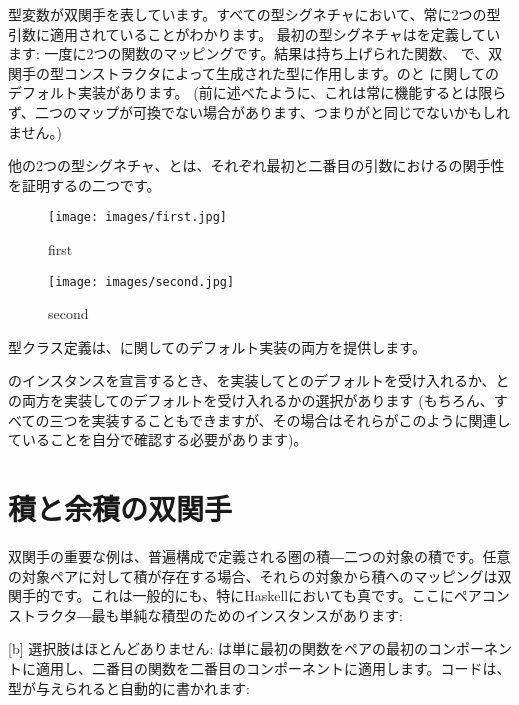 型変数が双関手を表しています。すべての型シグネチャにおいて、常に2つの型引数に適用されていることがわかります。
最初の型シグネチャはを定義しています: 一度に2つの関数のマッピングです。結果は持ち上げられた関数、
で、双関手の型コンストラクタによって生成された型に作用します。のと
に関してのデフォルト実装があります。 (前に述べたように、これは常に機能するとは限らず、二つのマップが可換でない場合があります、つまりがと同じでないかもしれません。) 

\noindent
他の2つの型シグネチャ、とは、それぞれ最初と二番目の引数におけるの関手性を証明するの二つです。

\begin{figure}[H]
  \centering
  \begin{minipage}{0.45\textwidth}
    \centering
    \texttt{[image: images/first.jpg]} %
    \caption{first}
  \end{minipage}\hfill
  \begin{minipage}{0.45\textwidth}
    \centering
    \texttt{[image: images/second.jpg]} %
    \caption{second}
  \end{minipage}
\end{figure}

\noindent
型クラス定義は、に関してのデフォルト実装の両方を提供します。

のインスタンスを宣言するとき、を実装してとのデフォルトを受け入れるか、との両方を実装してのデフォルトを受け入れるかの選択があります (もちろん、すべての三つを実装することもできますが、その場合はそれらがこのように関連していることを自分で確認する必要があります)。

\section{積と余積の双関手}

双関手の重要な例は、普遍構成で定義される圏の積―二つの対象の積です。任意の対象ペアに対して積が存在する場合、それらの対象から積へのマッピングは双関手的です。これは一般的にも、特にHaskellにおいても真です。ここにペアコンストラクタ―最も単純な積型のためのインスタンスがあります: 

[b]
選択肢はほとんどありません: は単に最初の関数をペアの最初のコンポーネントに適用し、二番目の関数を二番目のコンポーネントに適用します。コードは、型が与えられると自動的に書かれます: 

